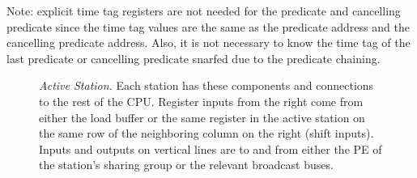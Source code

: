 \documentclass[10pt,dvips]{article}
\begin{document}
Note: explicit time tag registers are not needed for the predicate and cancelling
predicate since the time tag values are the same as the predicate address and
the cancelling predicate address. Also, it is not necessary to know the time tag
of the last predicate or cancelling predicate snarfed due to the predicate
chaining.

\begin{figure}
\centering
{}
\caption{{\em Active Station.} Each station has these components and connections to
the rest of the CPU. Register inputs from the right come from either the load buffer or
the same register in the active
station on the same row of the neighboring column on the right (shift inputs).
Inputs and outputs on vertical lines are to and from either the PE of the
station's sharing group or the relevant broadcast buses.}
\label{activestation}
\end{figure}
\end{document}
